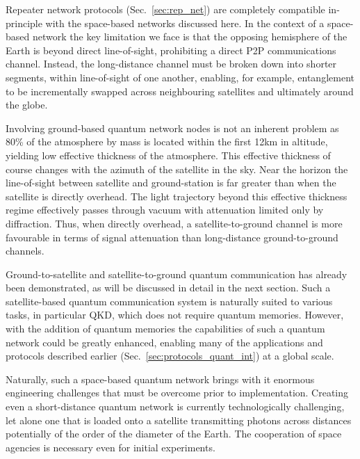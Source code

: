 Repeater network protocols (Sec.~\ref{sec:rep_net}) are completely compatible in-principle with the space-based networks discussed here. In the context of a space-based network the key limitation we face is that the opposing hemisphere of the Earth is beyond direct line-of-sight, prohibiting a direct P2P communications channel. Instead, the long-distance channel must be broken down into shorter segments, within line-of-sight of one another, enabling, for example, entanglement to be incrementally swapped across neighbouring satellites and ultimately around the globe.

Involving ground-based quantum network nodes is not an inherent problem as 80\% of the atmosphere by mass is located within the first 12km in altitude, yielding low effective thickness of the atmosphere. This effective thickness of course changes with the azimuth of the satellite in the sky. Near the horizon the line-of-sight between satellite and ground-station is far greater than when the satellite is directly overhead. The light trajectory beyond this effective thickness regime effectively passes through vacuum with attenuation limited only by diffraction. Thus, when directly overhead, a satellite-to-ground channel is more favourable in terms of signal attenuation than long-distance ground-to-ground channels.

Ground-to-satellite and satellite-to-ground quantum communication has already been demonstrated, as will be discussed in detail in the next section. Such a satellite-based quantum communication system is naturally suited to various tasks, in particular QKD, which does not require quantum memories. However, with the addition of quantum memories the capabilities of such a quantum network could be greatly enhanced, enabling many of the applications and protocols described earlier (Sec.~\ref{sec:protocols_quant_int}) at a global scale.

Naturally, such a space-based quantum network brings with it enormous engineering challenges that must be overcome prior to implementation. Creating even a short-distance quantum network is currently technologically challenging, let alone one that is loaded onto a satellite transmitting photons across distances potentially of the order of the diameter of the Earth. The cooperation of space agencies is necessary even for initial experiments.

